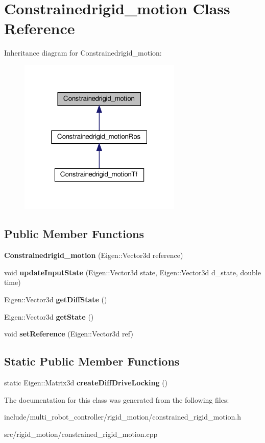 \hypertarget{classConstrainedrigid__motion}{}\section{Constrainedrigid\+\_\+motion Class Reference}
\label{classConstrainedrigid__motion}


Inheritance diagram for Constrainedrigid\+\_\+motion\+:\nopagebreak
\begin{figure}[H]
\begin{center}
\leavevmode
\includegraphics[width=220pt]{d2/ded/classConstrainedrigid__motion__inherit__graph}
\end{center}
\end{figure}
\subsection*{Public Member Functions}
\begin{DoxyCompactItemize}
\item 
{\bfseries Constrainedrigid\+\_\+motion} (Eigen\+::\+Vector3d reference)
\item 
void {\bfseries update\+Input\+State} (Eigen\+::\+Vector3d state, Eigen\+::\+Vector3d d\+\_\+state, double time)
\item 
Eigen\+::\+Vector3d {\bfseries get\+Diff\+State} ()
\item 
Eigen\+::\+Vector3d {\bfseries get\+State} ()
\item 
void {\bfseries set\+Reference} (Eigen\+::\+Vector3d ref)
\end{DoxyCompactItemize}
\subsection*{Static Public Member Functions}
\begin{DoxyCompactItemize}
\item 
static Eigen\+::\+Matrix3d {\bfseries create\+Diff\+Drive\+Locking} ()
\end{DoxyCompactItemize}


The documentation for this class was generated from the following files\+:\begin{DoxyCompactItemize}
\item 
include/multi\+\_\+robot\+\_\+controller/rigid\+\_\+motion/constrained\+\_\+rigid\+\_\+motion.\+h\item 
src/rigid\+\_\+motion/constrained\+\_\+rigid\+\_\+motion.\+cpp\end{DoxyCompactItemize}

